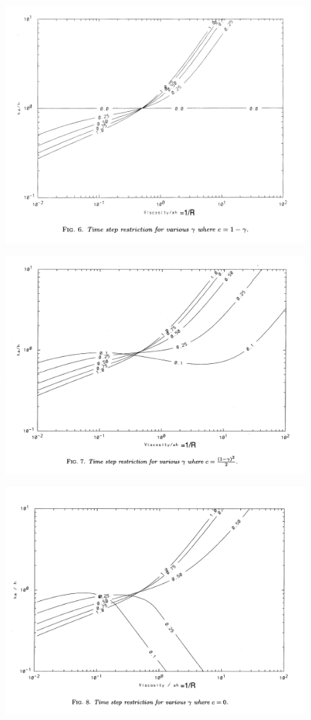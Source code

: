 \documentclass[12pt,a4paper]{article}
\begin{document}
\begin{figure}[H]
\centering
\includegraphics[scale=0.4]{./figures/Figure_2.png}
\end{figure}
\begin{figure}[H]
\centering
\includegraphics[scale=0.4]{./figures/Figure_3.png}
\end{figure}
\begin{figure}[H]
\centering
\includegraphics[scale=0.4]{./figures/Figure_4.png}
\end{figure}
\end{document}

